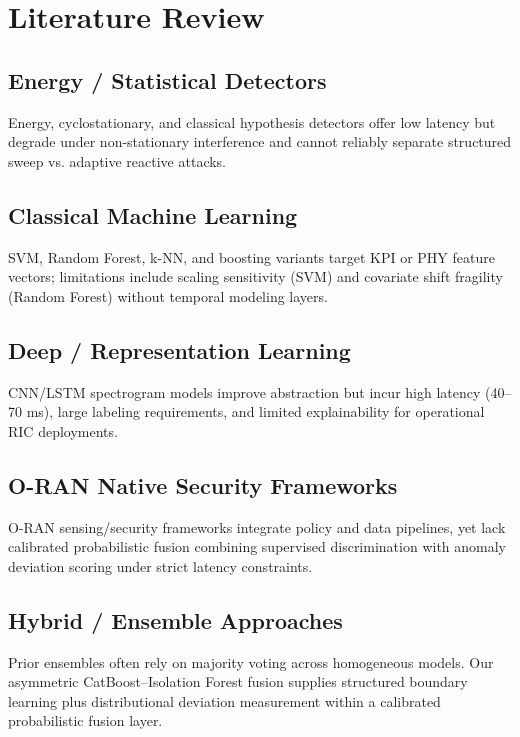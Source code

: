 \section{Literature Review}
\subsection{Energy / Statistical Detectors}
Energy, cyclostationary, and classical hypothesis detectors offer low latency but degrade under non-stationary interference and cannot reliably separate structured sweep vs. adaptive reactive attacks.
\subsection{Classical Machine Learning}
SVM, Random Forest, k-NN, and boosting variants target KPI or PHY feature vectors; limitations include scaling sensitivity (SVM) and covariate shift fragility (Random Forest) without temporal modeling layers.
\subsection{Deep / Representation Learning}
CNN/LSTM spectrogram models improve abstraction but incur high latency (40--70 ms), large labeling requirements, and limited explainability for operational RIC deployments.
\subsection{O-RAN Native Security Frameworks}
O-RAN sensing/security frameworks integrate policy and data pipelines, yet lack calibrated probabilistic fusion combining supervised discrimination with anomaly deviation scoring under strict latency constraints.
\subsection{Hybrid / Ensemble Approaches}
Prior ensembles often rely on majority voting across homogeneous models. Our asymmetric CatBoost–Isolation Forest fusion supplies structured boundary learning plus distributional deviation measurement within a calibrated probabilistic fusion layer.


